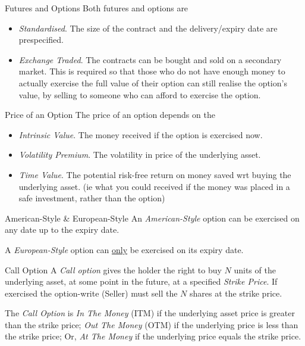 \documentclass[11pt,a4paper]{article}
\begin{document}
  \begin{remark}{Futures and Options}
    Both futures and options are
    \begin{itemize}
      \item \textit{Standardised}. The size of the contract and the delivery/expiry date are prespecified.
      \item \textit{Exchange Traded}. The contracts can be bought and sold on a secondary market. This is required so that those who do not have enough money to actually exercise the full value of their option can still realise the option's value, by selling to someone who can afford to exercise the option.
    \end{itemize}
  \end{remark}

  \begin{remark}{Price of an Option}
    The price of an option depends on the
    \begin{itemize}
      \item \textit{Intrinsic Value}. The money received if the option is exercised now.
      \item \textit{Volatility Premium}. The volatility in price of the underlying asset.
      \item \textit{Time Value}. The potential risk-free return on money saved wrt buying the underlying asset. (ie what you could received if the money was placed in a safe investment, rather than the option)
    \end{itemize}
  \end{remark}

  \begin{definition}{American-Style \& European-Style}
    An \textit{American-Style} option can be exercised on any date up to the expiry date.
    \par A \textit{European-Style} option can \underline{only} be exercised on its expiry date.
  \end{definition}

  \begin{definition}{Call Option}
    A \textit{Call option} gives the holder the right to buy $N$ units of the underlying asset, at some point in the future, at a specified \textit{Strike Price}. If exercised the option-write (Seller) must sell the $N$ shares at the strike price.
    \par The \textit{Call Option} is \textit{In The Money} (ITM) if the underlying asset price is greater than the strike price; \textit{Out The Money} (OTM) if the underlying price is less than the strike price; Or, \textit{At The Money} if the underlying price equals the strike price.
  \end{definition}
\end{document}
